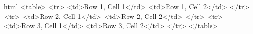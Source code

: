 html
<table>
  <tr>
    <td>Row 1, Cell 1</td>
    <td>Row 1, Cell 2</td>
  </tr>
  <tr>
    <td>Row 2, Cell 1</td>
    <td>Row 2, Cell 2</td>
  </tr>
  <tr>
    <td>Row 3, Cell 1</td>
    <td>Row 3, Cell 2</td>
  </tr>
</table>